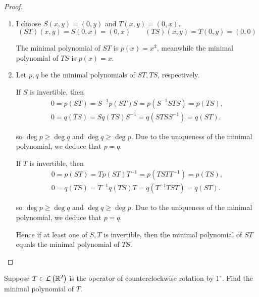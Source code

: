 \begin{proof}
    \begin{enumerate}[label={(\alph*)}]
        \item I choose $S(x, y) = (0, y)$ and $T(x, y) = (0, x)$.
              \[
                  (ST)(x, y) = S(0, x) = (0, x)\qquad (TS)(x, y) = T(0, y) = (0, 0)
              \]

              The minimal polynomial of $ST$ is $p(x) = x^{2}$, meanwhile the minimal polynomial of $TS$ is $p(x) = x$.
        \item Let $p, q$ be the minimal polynomials of $ST, TS$, respectively.

              If $S$ is invertible, then
              \[
                  \begin{split}
                      0 = p(ST) = S^{-1}p(ST)S = p(S^{-1}STS) = p(TS), \\
                      0 = q(TS) = Sq(TS)S^{-1} = q(STSS^{-1}) = q(ST).
                  \end{split}
              \]

              so $\deg p\geq \deg q$ and $\deg q\geq \deg p$. Due to the uniqueness of the minimal polynomial, we deduce that $p = q$.

              If $T$ is invertible, then
              \[
                  \begin{split}
                      0 = p(ST) = Tp(ST)T^{-1} = p(TSTT^{-1}) = p(TS), \\
                      0 = q(TS) = T^{-1}q(TS)T = q(T^{-1}TST) = q(ST).
                  \end{split}
              \]

              so $\deg p\geq \deg q$ and $\deg q\geq \deg p$. Due to the uniqueness of the minimal polynomial, we deduce that $p = q$.

              Hence if at least one of $S, T$ is invertible, then the minimal polynomial of $ST$ equals the minimal polynomial of $TS$.
    \end{enumerate}
\end{proof}
\newpage

\begin{exercise}
    Suppose $T\in\mathcal{L}\left({\mathbb{R}^{2}}\right)$ is the operator of counterclockwise rotation by $1^\circ$. Find the minimal polynomial of $T$.
\end{exercise}

